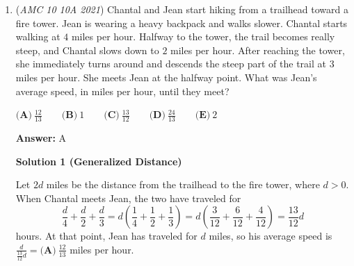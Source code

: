 \begin{enumerate}
Set $k=13.$ The answer is the same as the last student's quiz score, which is $8\cdot13-14\cdot12<0.$ From the answer choices, only $\boxed{\textbf{(B)} ~\frac{8k-168}{k-12}}$ is negative at $k=13.$




\textbf{Solution 3}

You know that the mean of the first $12$ students is $14,$ so that means all of them combined had a score of $12\cdot14 = 168.$ Set the mean of the remaining students (in other words the value you are trying to solve for), to $a.$ The total number of remaining students in a class of size $k$ can be written as $k-12.$ The total score $k-12$ students got combined can be written as $a(k-12),$ and the total score all of the students in the class got was $168 + a(k-12)$ (the first twelve students, plus the remaining students). The mean of the whole class can be written as $\frac{168 + a(k-12)}{k}.$ The mean of the class has already been given as $8,$ so by just writing the equation $\frac{168 + a(k-12)}{k} = 8,$ and solving for $a$ (the mean of $k-12$ students) will give you the answer in terms of $k,$ which is $\boxed{\textbf{(B)} ~\frac{8k-168}{k-12}}.$



	\item (\textit{AMC 10 10A 2021}) Chantal and Jean start hiking from a trailhead toward a fire tower. Jean is wearing a heavy backpack and walks slower. Chantal starts walking at $4$ miles per hour. Halfway to the tower, the trail becomes really steep, and Chantal slows down to $2$ miles per hour. After reaching the tower, she immediately turns around and descends the steep part of the trail at $3$ miles per hour. She meets Jean at the halfway point. What was Jean's average speed, in miles per hour, until they meet?


 $\textbf{(A)} ~\frac{12}{13} \qquad\textbf{(B)} ~1 \qquad\textbf{(C)} ~\frac{13}{12} \qquad\textbf{(D)}   ~\frac{24}{13} \qquad\textbf{(E)} ~2$

 \textbf{Answer: }A



\textbf{Solution 1 (Generalized Distance)}

Let $2d$ miles be the distance from the trailhead to the fire tower, where $d>0.$ When Chantal meets Jean, the two have traveled for 
 \[\frac d4 + \frac d2 + \frac d3 = d\left(\frac 14 + \frac 12 + \frac 13\right) =d\left(\frac{3}{12} + \frac{6}{12} + \frac{4}{12}\right)=\frac{13}{12}d\] hours. At that point, Jean has traveled for $d$ miles, so his average speed is $\frac{d}{\frac{13}{12}d}=\boxed{\textbf{(A)} ~\frac{12}{13}}$ miles per hour.


\end{enumerate}
